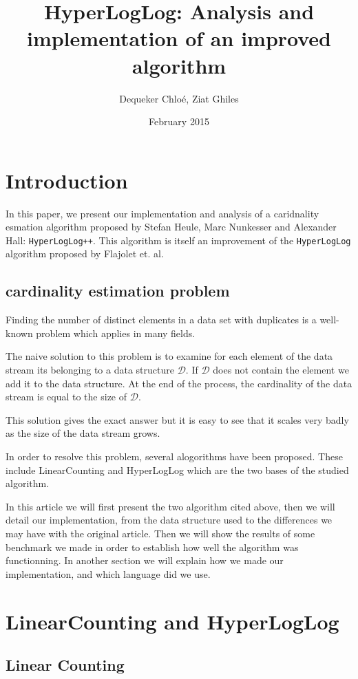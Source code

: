 \documentclass{article}
\title{HyperLogLog: Analysis and implementation of an improved algorithm}
\author{Dequeker Chlo\'e, Ziat Ghiles}
\date{February 2015}
\begin{document}
\maketitle
\clearpage

\tableofcontents
\clearpage

\section{Introduction}
In this paper, we present our implementation and analysis of a
caridnality esmation algorithm proposed by Stefan Heule, Marc
Nunkesser and Alexander Hall: \texttt{HyperLogLog++}. This algorithm
is itself an improvement of the \texttt{HyperLogLog} algorithm
proposed by Flajolet et. al.

\subsection{cardinality estimation problem}
Finding the number of distinct elements in a data set with duplicates
is a well-known problem which applies in many fields.

The naive solution to this problem is to examine for each element of
the data stream its belonging to a data structure $\mathcal{D}$. If
$\mathcal{D}$ does not contain the element we add it to the data
structure. At the end of the process, the cardinality of the data
stream is equal to the size of $\mathcal{D}$.

This solution gives the exact answer but it is easy to see that it
scales very badly as the size of the data stream grows.

In order to resolve this problem, several alogorithms have been
proposed. These include LinearCounting and HyperLogLog which are the two
bases of the studied algorithm.

In this article we will first present the two algorithm cited above, then 
we will detail our implementation, from the data structure used to the differences 
we may have with the original article. Then we will show the results of some benchmark we made in order to establish how well the algorithm was functionning. In another section we will explain how we made our implementation, and which language did we use. 

\clearpage
\section{LinearCounting and HyperLogLog}
\subsection{Linear Counting}
\end{document}
